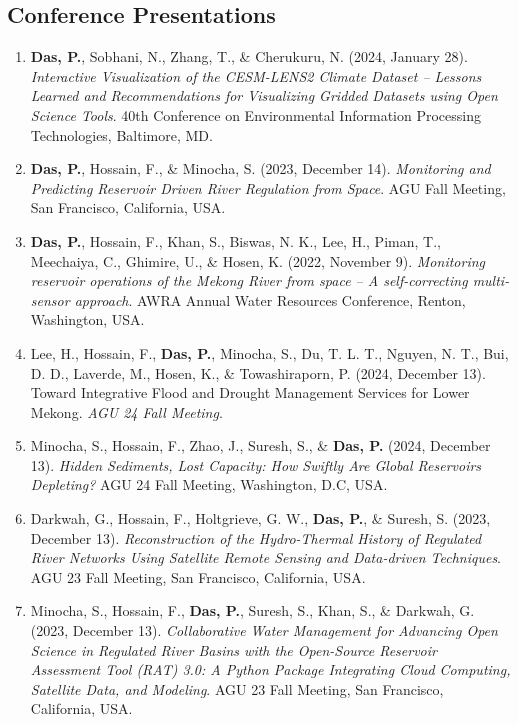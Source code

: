 \documentclass[a4paper,9pt]{extarticle}
\begin{document}
    \subsection*{Conference Presentations}
    \begin{enumerate}
        \item \textbf{Das, P.}, Sobhani, N., Zhang, T., \& Cherukuru, N. (2024, January 28). \textit{Interactive Visualization of the CESM-LENS2 Climate Dataset -- Lessons Learned and Recommendations for Visualizing Gridded Datasets using Open Science Tools}. 40th Conference on Environmental Information Processing Technologies, Baltimore, MD.

        \item \textbf{Das, P.}, Hossain, F., \& Minocha, S. (2023, December 14). \textit{Monitoring and Predicting Reservoir Driven River Regulation from Space}. AGU Fall Meeting, San Francisco, California, USA.

        \item \textbf{Das, P.}, Hossain, F., Khan, S., Biswas, N. K., Lee, H., Piman, T., Meechaiya, C., Ghimire, U., \& Hosen, K. (2022, November 9). \textit{Monitoring reservoir operations of the Mekong River from space -- A self-correcting multi-sensor approach}. AWRA Annual Water Resources Conference, Renton, Washington, USA.

        \item Lee, H., Hossain, F., \textbf{Das, P.}, Minocha, S., Du, T. L. T., Nguyen, N. T., Bui, D. D., Laverde, M., Hosen, K., \& Towashiraporn, P. (2024, December 13). Toward Integrative Flood and Drought Management Services for Lower Mekong. \textit{AGU 24 Fall Meeting}.

        \item Minocha, S., Hossain, F., Zhao, J., Suresh, S., \& \textbf{Das, P.} (2024, December 13). \textit{Hidden Sediments, Lost Capacity: How Swiftly Are Global Reservoirs Depleting?} AGU 24 Fall Meeting, Washington, D.C, USA.

        \item Darkwah, G., Hossain, F., Holtgrieve, G. W., \textbf{Das, P.}, \& Suresh, S. (2023, December 13). \textit{Reconstruction of the Hydro-Thermal History of Regulated River Networks Using Satellite Remote Sensing and Data-driven Techniques}. AGU 23 Fall Meeting, San Francisco, California, USA.

        \item Minocha, S., Hossain, F., \textbf{Das, P.}, Suresh, S., Khan, S., \& Darkwah, G. (2023, December 13). \textit{Collaborative Water Management for Advancing Open Science in Regulated River Basins with the Open-Source Reservoir Assessment Tool (RAT) 3.0: A Python Package Integrating Cloud Computing, Satellite Data, and Modeling}. AGU 23 Fall Meeting, San Francisco, California, USA.


\end{enumerate}
\end{document}
